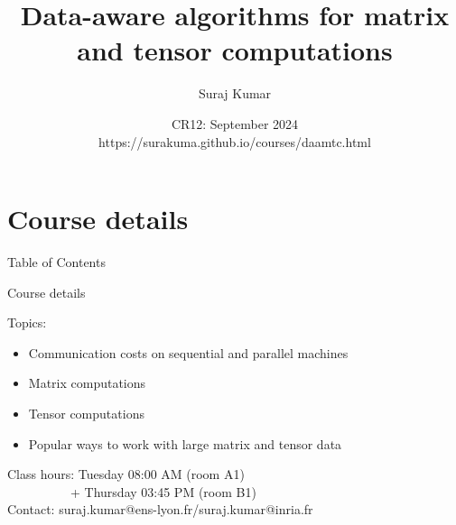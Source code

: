 \documentclass[
	12pt, %
]{beamer}
\title[Data-aware algorithms]{Data-aware algorithms for matrix and tensor computations} %
\author[Suraj Kumar]{Suraj Kumar} %
\institute[Inria \& ENS Lyon]{Inria \& ENS Lyon \\ \smallskip Email:\textit{suraj.kumar@ens-lyon.fr}} %
\date[CR12]{CR12: September 2024\\ \smallskip\small https://surakuma.github.io/courses/daamtc.html} %
\newcommand{\brown}[1]{{\color{brown} #1 }}
\begin{document}

\begin{frame}
	\titlepage %
\end{frame}


\section{Course details}
\begin{frame}{Table of Contents} 
	\tableofcontents[currentsection] %
\end{frame}


\begin{frame}{Course details}

\brown{Topics:}
	\begin{itemize}
		\item Communication costs on sequential and parallel machines
		\item Matrix computations
		\item Tensor computations
		\item Popular ways to work with large matrix and tensor data
	\end{itemize}
\vfill
\brown{Class hours:} Tuesday 08:00 AM (room A1) \\
$\qquad\qquad\quad$+ Thursday  03:45 PM (room B1)\\
\vfill
\brown{Contact:} suraj.kumar@ens-lyon.fr/suraj.kumar@inria.fr 
\end{frame}
\end{document}
